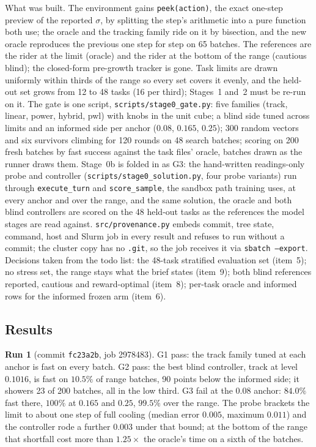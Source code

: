 \documentclass[11pt,a4paper]{article}
\begin{document}
What was built. The environment gains \texttt{peek(action)}, the exact
one-step preview of the reported $\sigma$, by splitting the step's arithmetic
into a pure function both use; the oracle and the tracking family ride on it
by bisection, and the new oracle reproduces the previous one step for step on
65 batches. The references are the rider at the limit (oracle) and the rider
at the bottom of the range (cautious blind); the closed-form pre-growth
tracker is gone. Task limits are drawn uniformly within thirds of the range so
every set covers it evenly, and the held-out set grows from 12 to 48 tasks
(16 per third); Stages~1 and~2 must be re-run on it. The gate is one script,
\texttt{scripts/stage0\_gate.py}: five families (track, linear, power, hybrid,
pwl) with knobs in the unit cube; a blind side tuned across limits and an
informed side per anchor ($0.08$, $0.165$, $0.25$); 300 random vectors and
six survivors climbing for 120 rounds on 48 search batches; scoring on 200
fresh batches by fast success against the task files' oracle, batches drawn
as the runner draws them. Stage~0b is folded in as G3: the hand-written
readings-only probe and controller (\texttt{scripts/stage0\_solution.py},
four probe variants) run through \texttt{execute\_turn} and
\texttt{score\_sample}, the sandbox path training uses, at every anchor and
over the range, and the same solution, the oracle and both blind controllers
are scored on the 48 held-out tasks as the references the model stages are
read against. \texttt{src/provenance.py} embeds commit, tree state, command,
host and Slurm job in every result and refuses to run without a commit; the
cluster copy has no \texttt{.git}, so the job receives it via
\texttt{sbatch --export}. Decisions taken from the todo list: the 48-task
stratified evaluation set (item~5); no stress set, the range stays what the
brief states (item~9); both blind references reported, cautious and
reward-optimal (item~8); per-task oracle and informed rows for the informed
frozen arm (item~6).

\subsection*{Results}

\textbf{Run 1} (commit \texttt{fc23a2b}, job 2978483). G1 pass: the track
family tuned at each anchor is fast on every batch. G2 pass: the best blind
controller, track at level $0.1016$, is fast on $10.5\%$ of range batches, 90
points below the informed side; it showers 23 of 200 batches, all in the low
third. G3 fail at the $0.08$ anchor: $84.0\%$ fast there, $100\%$ at $0.165$
and $0.25$, $99.5\%$ over the range. The probe brackets the limit to about one
step of full cooling (median error $0.005$, maximum $0.011$) and the
controller rode a further $0.003$ under that bound; at the bottom of the range
that shortfall cost more than $1.25\times$ the oracle's time on a sixth of the
batches.
\end{document}
